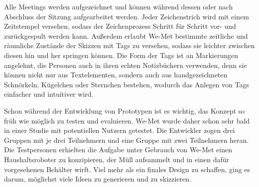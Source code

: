 Alle Meetings werden aufgezeichnet und können während dessen oder nach Abschluss der Sitzung aufgearbeitet werden. Jeder Zeichenstrich wird mit einem Zeitstempel versehen, sodass der Zeichenprozess Schritt für Schritt vor- und zurückgespult werden kann. Außerdem erlaubt We-Met bestimmte zeitliche und räumliche Zustände der Skizzen mit Tags zu versehen, sodass sie leichter zwischen diesen hin und her springen können. Die Form der Tags ist an Markierungen angelehnt, die Personen auch in ihren echten Notizbüchern verwenden, denn sie können nicht nur aus Textelementen, sondern auch aus handgezeichneten Schnörkeln, Kügelchen oder Sternchen bestehen, wodurch das Anlegen von Tags einfacher und intuitiver wird.

\medskip Schon während der Entwicklung von Prototypen ist es wichtig, das Konzept so früh wie möglich zu testen und evaluieren. We-Met wurde daher schon sehr bald in einer Studie mit potentiellen Nutzern getestet. Die Entwickler zogen drei Gruppen mit je drei Teilnehmern und eine Gruppe mit zwei Teilnehmern heran. Die Testpersonen erhielten die Aufgabe unter Gebrauch von We-Met einen Haushaltsroboter zu konzipieren, der Müll aufsammelt und in einen dafür vorgesehenen Behälter wirft. Viel mehr als ein finales Design zu schaffen, ging es darum, möglichst viele Ideen zu generieren und zu skizzieren.

